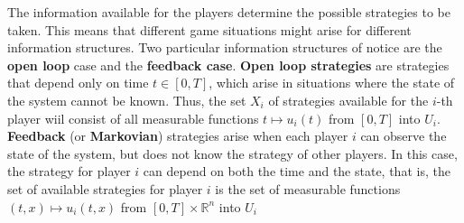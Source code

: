 \begin{enumerate}
    The information available for the players determine the possible strategies to be taken. This means that different game situations might arise for different information structures. Two particular information structures of notice are the \textbf{open loop} case and the \textbf{feedback case}. 
    \textbf{Open loop strategies} are strategies that depend only on time $t \in [0,T]$, which arise in situations where the state of the system cannot be known. Thus, the set $X_i$ of strategies available for the $i$-th player wiil consist of all measurable functions $t \mapsto u_i(t)$ from $[0,T]$ into $U_i$. \textbf{Feedback} (or \textbf{Markovian}) strategies arise when each player $i$ can observe the state of the system, but does not know the strategy of other players. In this case, the strategy for player $i$ can depend on both the time and the state, that is, the set of available strategies for player $i$ is the set of measurable functions $(t,x) \mapsto u_i(t,x)$ from $[0,T] \times \mathbb{R}^n$ into $U_i$ 
\end{enumerate}
